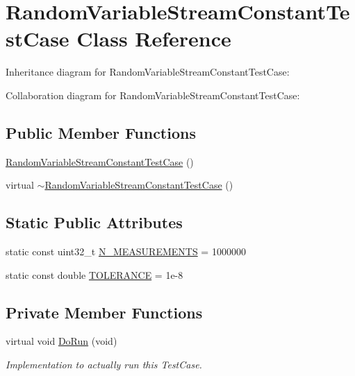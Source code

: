 \hypertarget{classRandomVariableStreamConstantTestCase}{}\section{Random\+Variable\+Stream\+Constant\+Test\+Case Class Reference}
\label{classRandomVariableStreamConstantTestCase}


Inheritance diagram for Random\+Variable\+Stream\+Constant\+Test\+Case\+:


Collaboration diagram for Random\+Variable\+Stream\+Constant\+Test\+Case\+:
\subsection*{Public Member Functions}
\begin{DoxyCompactItemize}
\item 
\hyperlink{classRandomVariableStreamConstantTestCase_aaa2a3a1b7fcc26df020d056ef60511fa}{Random\+Variable\+Stream\+Constant\+Test\+Case} ()
\item 
virtual \hyperlink{classRandomVariableStreamConstantTestCase_a088805854ff77fac118bd133e48e4568}{$\sim$\+Random\+Variable\+Stream\+Constant\+Test\+Case} ()
\end{DoxyCompactItemize}
\subsection*{Static Public Attributes}
\begin{DoxyCompactItemize}
\item 
static const uint32\+\_\+t \hyperlink{classRandomVariableStreamConstantTestCase_a0aef4480cc0cfb05d42b5cac17414297}{N\+\_\+\+M\+E\+A\+S\+U\+R\+E\+M\+E\+N\+TS} = 1000000
\item 
static const double \hyperlink{classRandomVariableStreamConstantTestCase_ad76975f181825a0da363ca9e7a2bf2ef}{T\+O\+L\+E\+R\+A\+N\+CE} = 1e-\/8
\end{DoxyCompactItemize}
\subsection*{Private Member Functions}
\begin{DoxyCompactItemize}
\item 
virtual void \hyperlink{classRandomVariableStreamConstantTestCase_a4ce02511f1ef542dc540bf1b67110107}{Do\+Run} (void)
\begin{DoxyCompactList}\small\item\em Implementation to actually run this Test\+Case. \end{DoxyCompactList}\end{DoxyCompactItemize}

